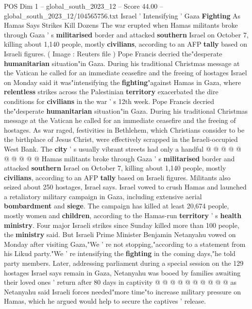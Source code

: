 \begin{textsample}{POS Dim 1 – global\_south\_2023\_12 – Score 44.00 – global\_south\_2023\_12/104565756.txt}  \label{ex:f1_pos_031}
Israel ' Intensifying ' Gaza \textbf{Fighting} As Hamas Says Strikes Kill Dozens The war erupted when Hamas militants broke through Gaza ' s \textbf{militarised} border and attacked \textbf{southern} Israel on October 7, killing about 1,140 people, mostly \textbf{civilians}, according to an AFP \textbf{tally} based on Israeli figures. ( Image : Reuters file ) Pope Francis decried the"desperate \textbf{humanitarian} situation"in Gaza.
During his traditional Christmas message at the Vatican he called for an immediate ceasefire and the freeing of hostages Israel on Monday said it was"intensifying the \textbf{fighting}"against Hamas in Gaza, where \textbf{relentless} strikes across the Palestinian \textbf{territory} exacerbated the dire conditions for \textbf{civilians} in the war ' s 12th week.
Pope Francis decried the"desperate \textbf{humanitarian} situation"in Gaza.
During his traditional Christmas message at the Vatican he called for an immediate ceasefire and the freeing of hostages.
As war raged, festivities in Bethlehem, which Christians consider to be the birthplace of Jesus Christ, were effectively scrapped in the Israeli-occupied West Bank.
The \textbf{city} ' s usually vibrant streets had only a handful @ @ @ @ @ @ @ @ @ @ Hamas militants broke through Gaza ' s \textbf{militarised} border and attacked \textbf{southern} Israel on October 7, killing about 1,140 people, mostly \textbf{civilians}, according to an AFP \textbf{tally} based on Israeli figures.
Militants also seized about 250 hostages, Israel says.
Israel vowed to crush Hamas and launched a retaliatory military campaign in Gaza, including extensive aerial \textbf{bombardment} and \textbf{siege}.
The campaign has killed at least 20,674 people, mostly women and \textbf{children}, according to the Hamas-run \textbf{territory} ' s \textbf{health} \textbf{ministry}.
Four major Israeli strikes since Sunday killed more than 100 people, the \textbf{ministry} said.
But Israeli Prime Minister Benjamin Netanyahu vowed on Monday after visiting Gaza,"We ' re not stopping,"according to a statement from his Likud party."We ' re intensifying the \textbf{fighting} in the coming days,"he told party members.
Later, addressing parliament during a special session on the 129 hostages Israel says remain in Gaza, Netanyahu was booed by families awaiting their loved ones ' return after 80 days in captivity @ @ @ @ @ @ @ @ @ @ as Netanyahu said Israeli forces needed"more time"to increase military pressure on Hamas, which he argued would help to secure the captives ' release.

\end{textsample}

